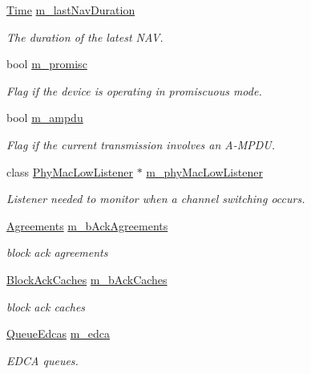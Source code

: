 \begin{DoxyCompactItemize}
\hyperlink{classns3_1_1Time}{Time} \hyperlink{classns3_1_1MacLow_a939a71bf7296a87bfc5bf2eb8b026b4b}{m\+\_\+last\+Nav\+Duration}
\begin{DoxyCompactList}\small\item\em The duration of the latest N\+AV. \end{DoxyCompactList}\item 
bool \hyperlink{classns3_1_1MacLow_ad13beb74b1519291ee00d14f1d532fdb}{m\+\_\+promisc}
\begin{DoxyCompactList}\small\item\em Flag if the device is operating in promiscuous mode. \end{DoxyCompactList}\item 
bool \hyperlink{classns3_1_1MacLow_a59c50cdd4a959f8dfc629d6df2e3cc00}{m\+\_\+ampdu}
\begin{DoxyCompactList}\small\item\em Flag if the current transmission involves an A-\/\+M\+P\+DU. \end{DoxyCompactList}\item 
class \hyperlink{classns3_1_1PhyMacLowListener}{Phy\+Mac\+Low\+Listener} $\ast$ \hyperlink{classns3_1_1MacLow_a1c49aaf243c751beb27655a0c5e72b86}{m\+\_\+phy\+Mac\+Low\+Listener}
\begin{DoxyCompactList}\small\item\em Listener needed to monitor when a channel switching occurs. \end{DoxyCompactList}\item 
\hyperlink{classns3_1_1MacLow_ad19858356831469ee643891fca0ef6a3}{Agreements} \hyperlink{classns3_1_1MacLow_a53482df1a7e6f136cfa8ce50fa10adc2}{m\+\_\+b\+Ack\+Agreements}
\begin{DoxyCompactList}\small\item\em block ack agreements \end{DoxyCompactList}\item 
\hyperlink{classns3_1_1MacLow_a9e628f9b15e0fd3eaf7b5eeb586ea968}{Block\+Ack\+Caches} \hyperlink{classns3_1_1MacLow_a1a2b5d95cae95e9b99e6508d7d350b47}{m\+\_\+b\+Ack\+Caches}
\begin{DoxyCompactList}\small\item\em block ack caches \end{DoxyCompactList}\item 
\hyperlink{classns3_1_1MacLow_aa79c94ba0439ea9fc9d91dc65f48fd8a}{Queue\+Edcas} \hyperlink{classns3_1_1MacLow_a754751ba4152c9337611a5f015045a44}{m\+\_\+edca}
\begin{DoxyCompactList}\small\item\em E\+D\+CA queues. \end{DoxyCompactList}\item 

\end{DoxyCompactItemize}
